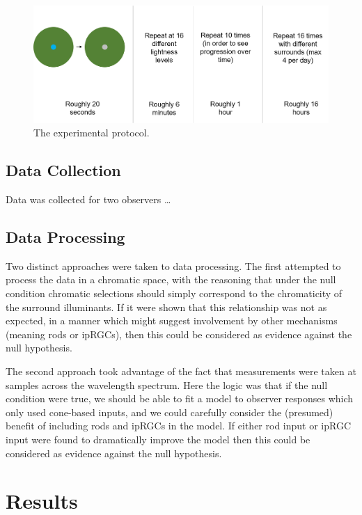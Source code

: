 \begin{figure}[htbp]
\includegraphics[max width=\textwidth]{figs/LargeSphere/ExperimentalPro.png}
\caption{The experimental protocol.}
\label{fig:ExperimentalPro}
\end{figure}

\subsection{Data Collection}

Data was collected for two observers \dots

\subsection{Data Processing}

Two distinct approaches were taken to data processing. The first attempted to process the data in a chromatic space, with the reasoning that under the null condition chromatic selections should simply correspond to the chromaticity of the surround illuminants. If it were shown that this relationship was not as expected, in a manner which might suggest involvement by other mechanisms (meaning rods or \glspl{ipRGC}), then this could be considered as evidence against the null hypothesis.

The second approach took advantage of the fact that measurements were taken at samples across the wavelength spectrum. Here the logic was that if the null condition were true, we should be able to fit a model to observer responses which only used cone-based inputs, and we could carefully consider the (presumed) benefit of including rods and \glspl{ipRGC} in the model. If either rod input or \gls{ipRGC} input were found to dramatically improve the model then this could be considered as evidence against the null hypothesis.

\section{Results}

